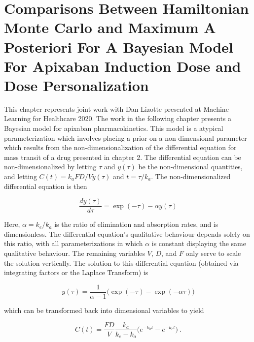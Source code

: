 \chapter[Comparisons Between HMC and MAP for Dose Personalization]{Comparisons Between Hamiltonian Monte Carlo and Maximum A Posteriori For A Bayesian Model For Apixaban Induction Dose and Dose Personalization}

This chapter represents joint work with Dan Lizotte presented at Machine Learning for Healthcare 2020.  The work in the following chapter presents a Bayesian model for apixaban pharmacokinetics.  This model is a atypical parameterization which involves placing a prior on a non-dimensional parameter which results from the non-dimensionalization of the differential equation for mass transit of a drug presented in chapter 2.  The differential equation can be non-dimensionalized by letting $\tau$ and $y(\tau)$ be the non-dimensional quantities, and letting $C(t) = k_a FD/V y(\tau)$ and $t = \tau/k_a$.  The non-dimensionalized differential equation is then

\begin{equation}
	\dfrac{dy(\tau)}{d\tau} = \exp(-\tau) - \alpha y(\tau)
\end{equation}

\noindent Here, $\alpha = k_e / k_a$ is the ratio of elimination and absorption rates, and is dimensionless.  The differential equation's qualitative behaviour depends solely on this ratio, with all parameterizations in which $\alpha$ is constant displaying the same qualitative behaviour.  The remaining variables $V$, $D$, and $F$ only serve to scale the solution vertically.  The solution to this differential equation (obtained via integrating factors or the Laplace Transform) is

\begin{equation}\label{key}
	y(\tau) = \dfrac{1}{\alpha -1} \Big( \exp(-\tau) - \exp(-\alpha \tau) \Big)
\end{equation}

\noindent which can be transformed back into dimensional variables to yield 

\begin{equation}\label{onecompartment_PKPD}
	C(t) = \dfrac{F D}{V}\dfrac{k_a}{k_e - k_a}\Big(e^{-k_at} - e^{-k_et}\Big) \>.
\end{equation}


